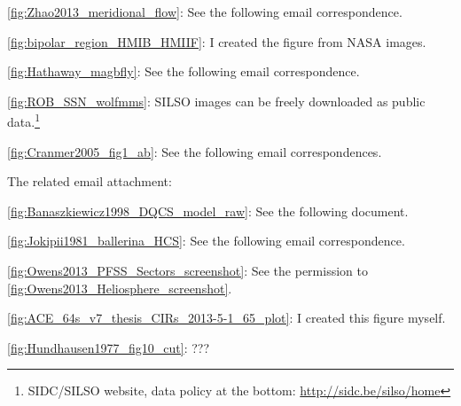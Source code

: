 \begin{itemize*}
	\item \autoref{fig:Zhao2013_meridional_flow}: See the following email correspondence.
	
	\item \autoref{fig:bipolar_region_HMIB_HMIIF}: I created the figure from NASA images.
	\item \autoref{fig:Hathaway_magbfly}: See the following email correspondence.
	
	\item \autoref{fig:ROB_SSN_wolfmms}: SILSO images can be freely downloaded as public data.\footnote{SIDC/SILSO website, data policy at the bottom: \url{http://sidc.be/silso/home}}
	\item \autoref{fig:Cranmer2005_fig1_ab}: See the following email correspondences.
	
	The related email attachment:
	
	\item \autoref{fig:Banaszkiewicz1998_DQCS_model_raw}: See the following document.\\
	\item \autoref{fig:Jokipii1981_ballerina_HCS}: See the following email correspondence.
	
	\item \autoref{fig:Owens2013_PFSS_Sectors_screenshot}: See the permission to \autoref{fig:Owens2013_Heliosphere_screenshot}.
	\item \autoref{fig:ACE_64s_v7_thesis_CIRs_2013-5-1_65_plot}: I created this figure myself.
	\item \autoref{fig:Hundhausen1977_fig10_cut}: ???


\end{itemize*}
